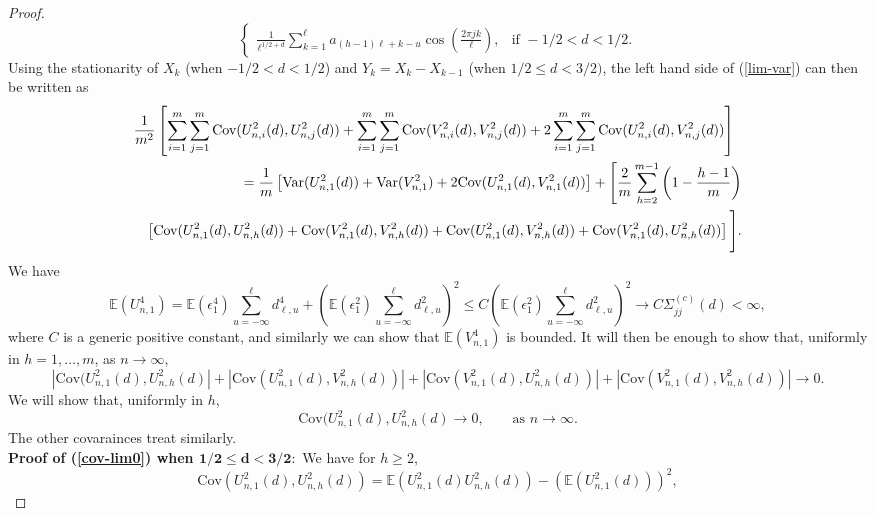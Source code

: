 \documentclass[12pt]{article}
\begin{document}
\begin{proof}
$$\begin{cases}
\frac{1}{\ell^{1/2+d}}\displaystyle\sum_{k=1}^\ell a_{(h-1)\ell+k-u}\cos\left(\frac{2\pi jk}{\ell}\right),&\textrm{if }-1/2<d<1/2.
\end{cases}
$$
Using the stationarity of $X_k$ (when $-1/2<d<1/2$) and $Y_k=X_k-X_{k-1}$ (when $1/2\le d<3/2)$,  the left hand side of (\ref{lim-var}) can then be written as
\begin{eqnarray*}\lefteqn{
\frac{1}{m^2}\left[\sum_{i=1}^m\sum_{j=1}^m\textrm{Cov}(U_{n,i}^2(d),U_{n,j}^2(d))+\sum_{i=1}^m\sum_{j=1}^m\textrm{Cov}(V_{n,i}^2(d),V_{n,j}^2(d))+2\sum_{i=1}^m\sum_{j=1}^m\textrm{Cov}(U_{n,i}^2(d),V_{n,j}^2(d))\right]}\\
&&=\frac{1}{m}\left[\textrm{Var}(U^2_{n,1}(d))+\textrm{Var}(V_{n,1}^2)+2\textrm{Cov}(U^2_{n,1}(d),V_{n,1}^2(d))\right]+\Bigg[\frac{2}{m}\sum_{h=2}^{m-1}\left(1-\frac{h-1}{m}\right)\\
&&\left[\textrm{Cov}(U^2_{n,1}(d),U^2_{n,h}(d))+\textrm{Cov}(V_{n,1}^2(d),V^2_{n,h}(d))+\textrm{Cov}(U^2_{n,1}(d),V^2_{n,h}(d))+\textrm{Cov}(V_{n,1}^2(d),U^2_{n,h}(d))\right]\Bigg].
\end{eqnarray*}
We have
\begin{equation}\label{4th moment}
\mathbb{E}\left(U_{n,1}^4\right)=
\mathbb{E}(\epsilon_1^4)\sum_{u=-\infty}^\ell d_{\ell,u}^4+\left(\mathbb{E}(\epsilon_1^2)\sum_{u=-\infty}^\ell d_{\ell,u}^2\right)^2\le C\left(\mathbb{E}(\epsilon_1^2)\sum_{u=-\infty}^\ell d_{\ell,u}^2\right)^2\to C\Sigma^{(c)}_{jj}(d)<\infty,
\end{equation}
where $C$ is a generic positive constant,
and similarly  we can show that $\mathbb{E}\left(V_{n,1}^4\right)$ is bounded. It will then be enough to show that, uniformly in $h=1,\ldots,m$, as $n\to\infty$,
\begin{equation*}
\left\vert\textrm{Cov}(U^2_{n,1}(d),U_{n,h}^2(d)\right\vert+\left\vert\textrm{Cov}(U^2_{n,1}(d),V_{n,h}^2(d))\right\vert+\left\vert\textrm{Cov}(V_{n,1}^2(d),U_{n,h}^2(d))\right\vert+\left\vert\textrm{Cov}(V_{n,1}^2(d),V_{n,h}^2(d))\right\vert\to0.
\end{equation*}
We will show that, uniformly in $h$,
\begin{equation}\label{cov-lim0}
    \textrm{Cov}(U^2_{n,1}(d),U_{n,h}^2(d)\to0,\qquad\textrm{as }n\to\infty.
\end{equation}
The other covarainces treat similarly.\\
{\bf Proof of (\ref{cov-lim0}) when $\mathbf{1/2\le d<3/2:}$}
We have for $h\ge2$, 
$$
\textrm{Cov}(U^2_{n,1}(d),U_{n,h}^2(d))=\mathbb{E}(U^2_{n,1}(d)U^2_{n,h}(d))-\left(\mathbb{E}(U^2_{n,1}(d))\right)^2,
$$
\end{proof}
\end{document}
